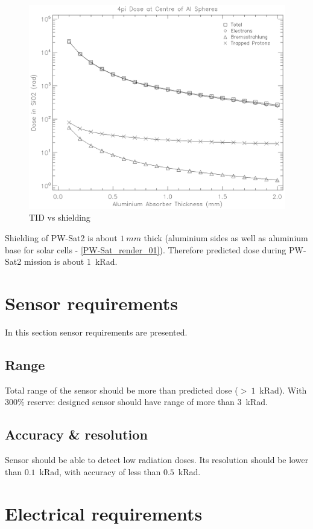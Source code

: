 	\begin{figure}[H]
		\centering
		\includegraphics[width=0.7\paperwidth]{img/dose.eps}
		\caption{TID vs shielding}
		\label{TIDvsSheilding}
	\end{figure}

	Shielding of PW-Sat2 is about $1~mm$ thick (aluminium sides as well as aluminium base for solar cells - \ref{PW-Sat_render_01}). Therefore predicted dose during PW-Sat2 mission is about $1$~kRad.


\section{Sensor requirements}
	In this section sensor requirements are presented.

\subsection{Range}
	Total range of the sensor should be more than predicted dose ($>~1$~kRad). With $300\%$ reserve: designed sensor should have range of more than $3$~kRad.
	
\subsection{Accuracy \& resolution}
	Sensor should be able to detect low radiation doses. Its resolution should be lower than $0.1$~kRad, with accuracy of less than $0.5$~kRad.


\section{Electrical requirements}
	
